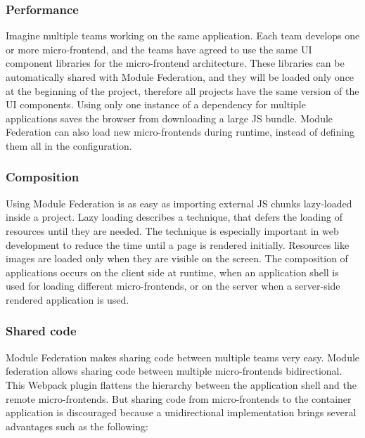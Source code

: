 \subsubsection{Performance}\label{subsubsection:background:micro-frontend:module-federation:performance}

Imagine multiple teams working on the same application. Each team develops one or more micro-frontend, and the teams have agreed to use the same \ac{UI} component libraries for the micro-frontend architecture. These libraries can be automatically shared with Module Federation, and they will be loaded only once at the beginning of the project, therefore all projects have the same version of the \ac{UI} components. Using only one instance of a dependency for multiple applications saves the browser from downloading a large \ac{JS} bundle. Module Federation can also load new micro-frontends during runtime, instead of defining them all in the configuration. \cite[83]{book:2021:mezzalira:applied-methods:building-micro-frontends}

\subsubsection{Composition}\label{subsubsection:background:micro-frontend:module-federation:composition}

Using Module Federation is as easy as importing external \ac{JS} chunks lazy-loaded inside a project. Lazy loading describes a technique, that defers the loading of resources until they are needed. The technique is especially important in web development to reduce the time until a page is rendered initially. Resources like images are loaded only when they are visible on the screen. The composition of applications occurs on the client side at runtime, when an application shell is used for loading different micro-frontends, or on the server when a server-side rendered application is used. \cite[84]{book:2021:mezzalira:applied-methods:building-micro-frontends}

\subsubsection{Shared code}\label{subsubsection:background:micro-frontend:module-federation:shared-code}

Module Federation makes sharing code between multiple teams very easy. Module federation allows sharing code between multiple micro-frontends bidirectional. This Webpack plugin flattens the hierarchy between the application shell and the remote micro-frontends. But sharing code from micro-frontends to the container application is discouraged because a unidirectional implementation brings several advantages such as the following: \cite[84]{book:2021:mezzalira:applied-methods:building-micro-frontends}

